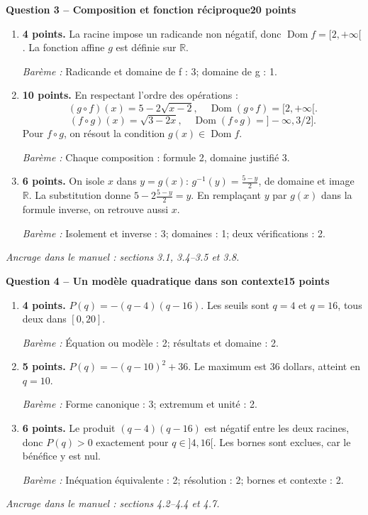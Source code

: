 \documentclass[11pt,a4paper]{article}
\begin{document}
\newpage
{\large\bfseries Question 3 -- Composition et fonction réciproque}\hfill\textbf{20 points}\par
\begin{enumerate}
\item \textbf{4 points.} La racine impose un radicande non négatif, donc \(\operatorname{Dom}f=[2,+\infty[\). La fonction affine \(g\) est définie sur \(\mathbb R\).
\par{\small\textit{Barème : }Radicande et domaine de f : 3; domaine de g : 1.}
\item \textbf{10 points.} En respectant l’ordre des opérations : \[(g\circ f)(x)=5-2\sqrt{x-2},\quad \operatorname{Dom}(g\circ f)=[2,+\infty[.\] \[(f\circ g)(x)=\sqrt{3-2x},\quad \operatorname{Dom}(f\circ g)=]-\infty,3/2].\] Pour \(f\circ g\), on résout la condition \(g(x)\in\operatorname{Dom}f\).
\par{\small\textit{Barème : }Chaque composition : formule 2, domaine justifié 3.}
\item \textbf{6 points.} On isole \(x\) dans \(y=g(x)\): \(g^{-1}(y)=\frac{5-y}{2}\), de domaine et image \(\mathbb R\). La substitution donne \(5-2\frac{5-y}{2}=y\). En remplaçant \(y\) par \(g(x)\) dans la formule inverse, on retrouve aussi \(x\).
\par{\small\textit{Barème : }Isolement et inverse : 3; domaines : 1; deux vérifications : 2.}
\end{enumerate}
\vfill {\small\textit{Ancrage dans le manuel : sections 3.1, 3.4--3.5 et 3.8.}}

\newpage
{\large\bfseries Question 4 -- Un modèle quadratique dans son contexte}\hfill\textbf{15 points}\par
\begin{enumerate}
\item \textbf{4 points.} \(P(q)=-(q-4)(q-16)\). Les seuils sont \(q=4\) et \(q=16\), tous deux dans \([0,20]\).
\par{\small\textit{Barème : }Équation ou modèle : 2; résultats et domaine : 2.}
\item \textbf{5 points.} \(P(q)=-(q-10)^2+36\). Le maximum est \(36\) dollars, atteint en \(q=10\).
\par{\small\textit{Barème : }Forme canonique : 3; extremum et unité : 2.}
\item \textbf{6 points.} Le produit \((q-4)(q-16)\) est négatif entre les deux racines, donc \(P(q)>0\) exactement pour \(q\in]4,16[\). Les bornes sont exclues, car le bénéfice y est nul.
\par{\small\textit{Barème : }Inéquation équivalente : 2; résolution : 2; bornes et contexte : 2.}
\end{enumerate}
\vfill {\small\textit{Ancrage dans le manuel : sections 4.2--4.4 et 4.7.}}
\end{document}
